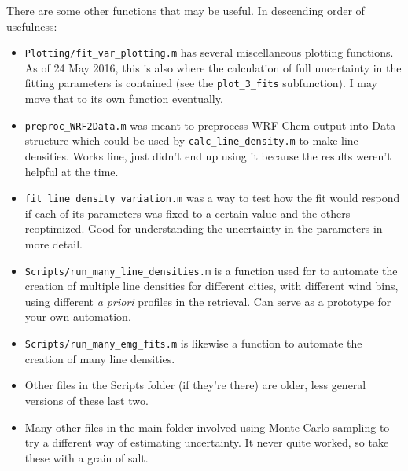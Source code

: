 \documentclass[12pt]{article}
\begin{document}
		There are some other functions that may be useful. In descending order of usefulness:
		\begin{itemize}
		\item \lstinline$Plotting/fit_var_plotting.m$ has several miscellaneous plotting functions. As of 24 May 2016, this is also where the calculation of full uncertainty in the fitting parameters is contained (see the \lstinline$plot_3_fits$ subfunction). I may move that to its own function eventually.
		
		\item \lstinline$preproc_WRF2Data.m$ was meant to preprocess WRF-Chem output into Data structure which could be used by \lstinline$calc_line_density.m$ to make line densities. Works fine, just didn't end up using it because the results weren't helpful at the time.
		
		\item \lstinline$fit_line_density_variation.m$ was a way to test how the fit would respond if each of its parameters was fixed to a certain value and the others reoptimized. Good for understanding the uncertainty in the parameters in more detail.
		
		\item \lstinline$Scripts/run_many_line_densities.m$ is a function used for \citet{laughner16} to automate the creation of multiple line densities for different cities, with different wind bins, using different \emph{a priori} profiles in the retrieval. Can serve as a prototype for your own automation.
		
		\item \lstinline$Scripts/run_many_emg_fits.m$ is likewise a function to automate the creation of many line densities.
		
		\item Other files in the Scripts folder (if they're there) are older, less general versions of these last two.
		
		\item Many other files in the main  folder involved using Monte Carlo sampling to try a different way of estimating uncertainty. It never quite worked, so take these with a grain of salt.		
		\end{itemize}
		
\end{document}
